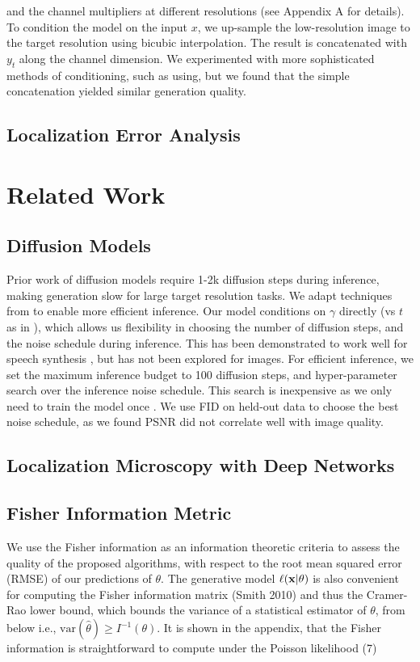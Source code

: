 \documentclass{article}
\begin{document}
and the channel multipliers at different resolutions (see Appendix A for details). To condition the model on the input $x$, we up-sample the low-resolution image to the target resolution using bicubic interpolation. The result is concatenated with $y_t$ along the channel dimension. We experimented with more sophisticated methods of conditioning, such as using, but we found that the simple concatenation yielded similar generation quality.

\subsection{Localization Error Analysis}


\section{Related Work}

\subsection{Diffusion Models}

Prior work of diffusion models \cite{ref17, ref51} require 1-2k diffusion steps during inference, making generation slow for large target resolution tasks. We adapt techniques from \cite{ref6} to enable more efficient inference. Our model conditions on $\gamma$ directly (vs $t$ as in \cite{ref17}), which allows us flexibility in choosing the number of diffusion steps, and the noise schedule during inference. This has been demonstrated to work well for speech synthesis \cite{ref6}, but has not been explored for images. For efficient inference, we set the maximum inference budget to 100 diffusion steps, and hyper-parameter search over the inference noise schedule. This search is inexpensive as we only need to train the model once \cite{ref6}. We use FID on held-out data to choose the best noise schedule, as we found PSNR did not correlate well with image quality.

\subsection{Localization Microscopy with Deep Networks}


\subsection{Fisher Information Metric}

We use the Fisher information as an information theoretic criteria to assess the quality of the proposed algorithms, with respect to the root mean squared error (RMSE) of our predictions of $\theta$. The generative model $\ell(\bold{x}|\theta)$ is also convenient for computing the Fisher information matrix (Smith 2010) and thus the Cramer-Rao lower bound, which bounds the variance of a statistical estimator of $\theta$, from below i.e., $\mathrm{var}(\hat{\theta}) \geq I^{-1}(\theta)$. It is shown in the appendix, that the Fisher information is straightforward to compute under the Poisson likelihood (7)
\end{document}
